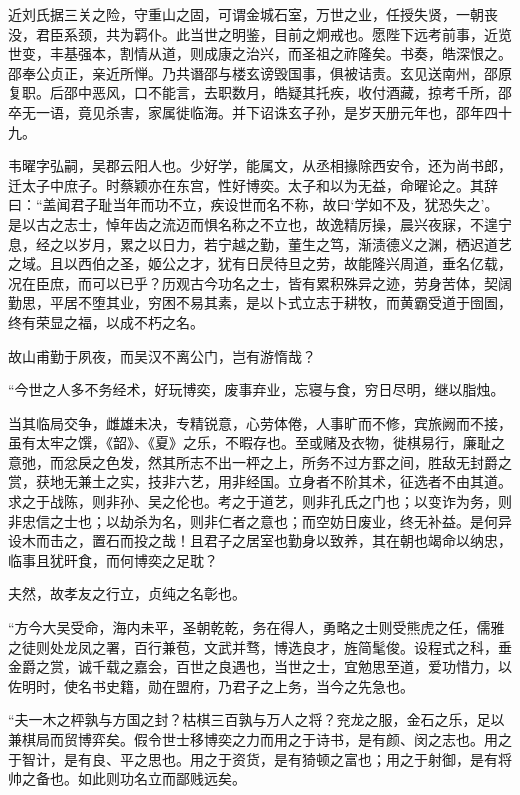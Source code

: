 \documentclass[12pt,UTF8]{ctexbook}
\begin{document}
近刘氏据三关之险，守重山之固，可谓金城石室，万世之业，任授失贤，一朝丧没，君臣系颈，共为羁仆。此当世之明鉴，目前之炯戒也。愿陛下远考前事，近览世变，丰基强本，割情从道，则成康之治兴，而圣祖之祚隆矣。书奏，皓深恨之。邵奉公贞正，亲近所惮。乃共谮邵与楼玄谤毁国事，俱被诘责。玄见送南州，邵原复职。后邵中恶风，口不能言，去职数月，皓疑其托疾，收付酒藏，掠考千所，邵卒无一语，竟见杀害，家属徙临海。并下诏诛玄子孙，是岁天册元年也，邵年四十九。

韦曜字弘嗣，吴郡云阳人也。少好学，能属文，从丞相掾除西安令，还为尚书郎，迁太子中庶子。时蔡颖亦在东宫，性好博奕。太子和以为无益，命曜论之。其辞曰：“盖闻君子耻当年而功不立，疾设世而名不称，故曰‘学如不及，犹恐失之’。是以古之志士，悼年齿之流迈而惧名称之不立也，故逸精厉操，晨兴夜寐，不遑宁息，经之以岁月，累之以日力，若宁越之勤，董生之笃，渐渍德义之渊，栖迟道艺之域。且以西伯之圣，姬公之才，犹有日昃待旦之劳，故能隆兴周道，垂名亿载，况在臣庶，而可以已乎？历观古今功名之士，皆有累积殊异之迹，劳身苦体，契阔勤思，平居不堕其业，穷困不易其素，是以卜式立志于耕牧，而黄霸受道于囹圄，终有荣显之福，以成不朽之名。

故山甫勤于夙夜，而吴汉不离公门，岂有游惰哉？

“今世之人多不务经术，好玩博奕，废事弃业，忘寝与食，穷日尽明，继以脂烛。

当其临局交争，雌雄未决，专精锐意，心劳体倦，人事旷而不修，宾旅阙而不接，虽有太牢之馔，《韶》、《夏》之乐，不暇存也。至或赌及衣物，徙棋易行，廉耻之意弛，而忿戾之色发，然其所志不出一枰之上，所务不过方罫之间，胜敌无封爵之赏，获地无兼土之实，技非六艺，用非经国。立身者不阶其术，征选者不由其道。求之于战陈，则非孙、吴之伦也。考之于道艺，则非孔氏之门也；以变诈为务，则非忠信之士也；以劫杀为名，则非仁者之意也；而空妨日废业，终无补益。是何异设木而击之，置石而投之哉！且君子之居室也勤身以致养，其在朝也竭命以纳忠，临事且犹旰食，而何博奕之足耽？

夫然，故孝友之行立，贞纯之名彰也。

“方今大吴受命，海内未平，圣朝乾乾，务在得人，勇略之士则受熊虎之任，儒雅之徒则处龙凤之署，百行兼苞，文武并骛，博选良才，旌简髦俊。设程式之科，垂金爵之赏，诚千载之嘉会，百世之良遇也，当世之士，宜勉思至道，爱功惜力，以佐明时，使名书史籍，勋在盟府，乃君子之上务，当今之先急也。

“夫一木之枰孰与方国之封？枯棋三百孰与万人之将？兖龙之服，金石之乐，足以兼棋局而贸博弈矣。假令世士移博奕之力而用之于诗书，是有颜、闵之志也。用之于智计，是有良、平之思也。用之于资货，是有猗顿之富也；用之于射御，是有将帅之备也。如此则功名立而鄙贱远矣。
\end{document}
